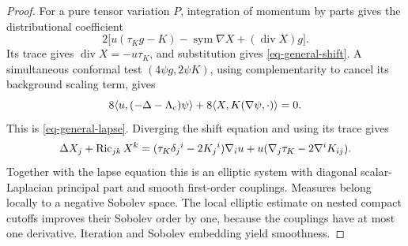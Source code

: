 \begin{proof}
For a pure tensor variation \(P\), integration of momentum by parts
gives the distributional coefficient
\[
 2\big[u(\tau_Kg-K)-\operatorname{sym}\nabla X
                         +(\operatorname{div}X)g\big].
\]
Its trace gives \(\operatorname{div}X=-u\tau_K\), and substitution
gives \eqref{eq-general-shift}.  A simultaneous conformal test
\((4\psi g,2\psi K)\), using complementarity to cancel its background
scaling term, gives
\[
 8\langle u,(-\Delta-\Lambda_{\rm c})\psi\rangle
       +8\langle X,K(\nabla\psi,\cdot)\rangle=0.
\]
This is \eqref{eq-general-lapse}.  Diverging the shift equation and
using its trace gives
\begin{equation}
 \Delta X_j+\operatorname{Ric}_{jk}X^k
  =(\tau_K\delta_j{}^i-2K_j{}^i)\nabla_i u
       +u(\nabla_j\tau_K-2\nabla^iK_{ij}).
 \label{eq-vector-elliptic}
\end{equation}
Together with the lapse equation this is an elliptic system with
diagonal scalar-Laplacian principal part and smooth first-order
couplings.  Measures belong locally to a negative Sobolev space.
The local elliptic estimate on nested compact cutoffs improves
their Sobolev order by one, because the couplings have at most
one derivative.  Iteration and Sobolev embedding yield smoothness.


\end{proof}
